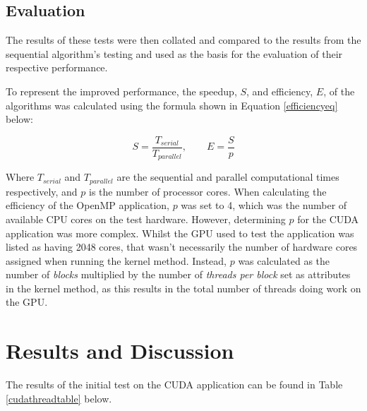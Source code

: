 \documentclass[12pt,journal,transmag]{IEEEtran}
\begin{document}
	\subsection{Evaluation}
	The results of these tests were then collated and compared to the results from the sequential algorithm's testing and used as the basis for the evaluation of their respective performance.
	
	To represent the improved performance, the speedup, $S$, and efficiency, $E$, of the algorithms was calculated using the formula shown in Equation \ref{efficiencyeq} below:
	
	\begin{equation} \label{efficiencyeq} 
		S = \dfrac{T_{serial}}{T_{parallel}}, \qquad E = \dfrac{S}{p}
	\end{equation}
	
	Where $T_{serial}$ and $T_{parallel}$ are the sequential and parallel computational times respectively, and $p$ is the number of processor cores. When calculating the efficiency of the OpenMP application, $p$ was set to 4, which was the number of available CPU cores on the test hardware. However, determining $p$ for the CUDA application was more complex. Whilst the GPU used to test the application was listed as having 2048 cores, that wasn't necessarily the number of hardware cores assigned when running the kernel method. Instead, $p$ was calculated as the number of \textit{blocks} multiplied by the number of \textit{threads per block} set as attributes in the kernel method, as this results in the total number of threads doing work on the GPU.
	
	\section{Results and Discussion}
	
	The results of the initial test on the CUDA application can be found in Table \ref{cudathreadtable} below.
	
	\begin{table}[!h]
		\caption{CUDA Performance: Threads Per Block}
		\label{cudathreadtable}
		\centering
	\end{table}
\end{document}
